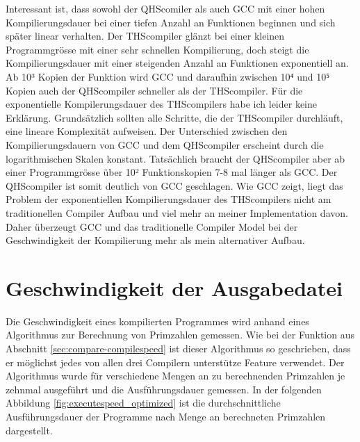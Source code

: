 Interessant ist, dass sowohl der QHScomiler als auch GCC mit einer hohen Kompilierungsdauer bei einer tiefen Anzahl an Funktionen beginnen und sich später linear verhalten.
Der THScompiler glänzt bei einer kleinen Programmgrösse mit einer sehr schnellen Kompilierung, doch steigt die Kompilierungsdauer mit einer steigenden Anzahl an Funktionen exponentiell an.
Ab 10³ Kopien der Funktion wird GCC und daraufhin zwischen 10⁴ und 10⁵ Kopien auch der QHScompiler schneller als der THScompiler.
Für die exponentielle Kompilerungsdauer des THScompilers habe ich leider keine Erklärung. Grundsätzlich sollten alle Schritte, die der THScompiler durchläuft, eine lineare Komplexität aufweisen.
Der Unterschied zwischen den Kompilierungsdauern von GCC und dem QHScompiler erscheint durch die logarithmischen Skalen konstant.
Tatsächlich braucht der QHScompiler aber ab einer Programmgrösse über 10² Funktionskopien 7-8 mal länger als GCC. 
Der QHScompiler ist somit deutlich von GCC geschlagen. Wie GCC zeigt, liegt das Problem der exponentiellen Kompilierungsdauer des THScompilers nicht am traditionellen Compiler Aufbau und viel mehr an meiner Implementation davon.
Daher überzeugt GCC und das traditionelle Compiler Model bei der Geschwindigkeit der Kompilierung mehr als mein alternativer Aufbau.


\section{Geschwindigkeit der Ausgabedatei} \label{sec:execute_speed}
Die Geschwindigkeit eines kompilierten Programmes wird anhand eines Algorithmus zur Berechnung von Primzahlen gemessen. Wie bei der Funktion aus Abschnitt \ref{sec:compare-compilespeed} ist dieser Algorithmus so geschrieben,
dass er möglichst jedes von allen drei Compilern unterstütze Feature verwendet. Der Algorithmus wurde für verschiedene Mengen an zu berechnenden Primzahlen je zehnmal ausgeführt und die Ausführungsdauer gemessen.
In der folgenden Abbildung \ref{fig:executespeed_optimized} ist die durchschnittliche Ausführungsdauer der Programme nach Menge an berechneten Primzahlen dargestellt.

